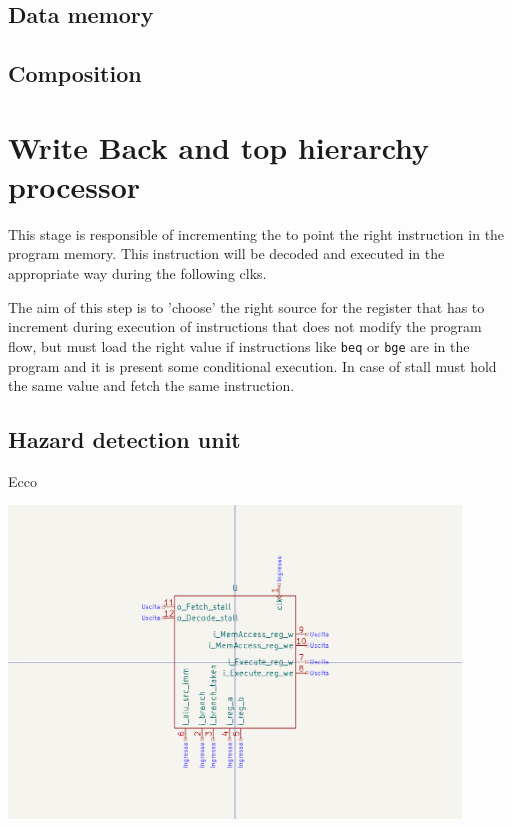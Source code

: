 \documentclass{article}
\begin{document}
\subsection{Data memory}\label{D_MEM}

\subsection*{Composition}

\section{Write Back and top hierarchy processor}\label{WB}
This stage is responsible of incrementing the \PC to point the right instruction in the program memory.
This instruction will be decoded and executed in the appropriate way during the following \glspl{clk}. 

The aim of this step is to 'choose' the right source for the \PC register that has to increment during execution of instructions that does not modify the program flow, but must load the right value if instructions like \texttt{beq} or \texttt{bge} are in the program and it is present some conditional execution.
In case of \gls{stall} must hold the same value and fetch the same instruction.

\subsection{Hazard detection unit}\label{HDU}
\begin{minipage}{0.48\textwidth}
  Ecco
\end{minipage}
\begin{minipage}{0.48\textwidth}
  \includegraphics[width=0.9\textwidth,right,trim={450 150 450 150},clip]{components/HDU.png}
\end{minipage}
\end{document}
